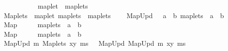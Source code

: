 \begin{isabellebody}
\ \ {\isachardoublequoteopen}{\isachardoublequoteclose}\ \ \ \ \ \ \ \ \ {\isacharcolon}{\isacharcolon}\ {\isachardoublequoteopen}maplet\ {\isasymRightarrow}\ maplets{\isachardoublequoteclose}\ \ \ \ \ \ \ \ \ \ \ \ \ {\isacharparenleft}{\isachardoublequoteopen}{\isacharunderscore}{\isachardoublequoteclose}{\isacharparenright}\isanewline
\ \ {\isachardoublequoteopen}{\isacharunderscore}Maplets{\isachardoublequoteclose}\ {\isacharcolon}{\isacharcolon}\ {\isachardoublequoteopen}{\isacharbrackleft}maplet{\isacharcomma}\ maplets{\isacharbrackright}\ {\isasymRightarrow}\ maplets{\isachardoublequoteclose}\ {\isacharparenleft}{\isachardoublequoteopen}{\isacharunderscore}{\isacharcomma}{\isacharslash}\ {\isacharunderscore}{\isachardoublequoteclose}{\isacharparenright}\isanewline
\ \ {\isachardoublequoteopen}{\isacharunderscore}MapUpd{\isachardoublequoteclose}\ \ {\isacharcolon}{\isacharcolon}\ {\isachardoublequoteopen}{\isacharbrackleft}{\isacharprime}a\ {\isasymrightharpoonup}\ {\isacharprime}b{\isacharcomma}\ maplets{\isacharbrackright}\ {\isasymRightarrow}\ {\isacharprime}a\ {\isasymrightharpoonup}\ {\isacharprime}b{\isachardoublequoteclose}\ {\isacharparenleft}{\isachardoublequoteopen}{\isacharunderscore}{\isacharslash}{\isacharprime}{\isacharparenleft}{\isacharunderscore}{\isacharprime}{\isacharparenright}{\isachardoublequoteclose}\ {\isacharbrackleft}{}{}{}{\isacharcomma}\ {}{\isacharbrackright}\ {}{}{}{\isacharparenright}\isanewline
\ \ {\isachardoublequoteopen}{\isacharunderscore}Map{\isachardoublequoteclose}\ \ \ \ \ {\isacharcolon}{\isacharcolon}\ {\isachardoublequoteopen}maplets\ {\isasymRightarrow}\ {\isacharprime}a\ {\isasymrightharpoonup}\ {\isacharprime}b{\isachardoublequoteclose}\ \ \ \ \ \ \ \ \ \ \ \ {\isacharparenleft}{\isachardoublequoteopen}{\isacharparenleft}{}{\isacharbrackleft}{\isacharunderscore}{\isacharbrackright}{\isacharparenright}{\isachardoublequoteclose}{\isacharparenright}\isanewline
\ \ {\isachardoublequoteopen}{\isacharunderscore}Map{\isachardoublequoteclose}\ \ \ \ \ {\isacharcolon}{\isacharcolon}\ {\isachardoublequoteopen}maplets\ {\isasymRightarrow}\ {\isacharprime}a\ {\isasymrightharpoonup}\ {\isacharprime}b{\isachardoublequoteclose}\ \ \ \ \ \ \ \ \ \ \ \ {\isacharparenleft}{\isachardoublequoteopen}{\isacharparenleft}{}{\isacharless}{\isacharunderscore}{\isachargreater}{\isacharparenright}{\isachardoublequoteclose}{\isacharparenright}\isanewline
\isanewline
{}\isamarkupfalse%
\isanewline
\ \ {\isachardoublequoteopen}{\isacharunderscore}MapUpd\ m\ {\isacharparenleft}{\isacharunderscore}Maplets\ xy\ ms{\isacharparenright}{\isachardoublequoteclose}\ \ {\isasymrightleftharpoons}\ {\isachardoublequoteopen}{\isacharunderscore}MapUpd\ {\isacharparenleft}{\isacharunderscore}MapUpd\ m\ xy{\isacharparenright}\ ms{\isachardoublequoteclose}\isanewline

\end{isabellebody}
